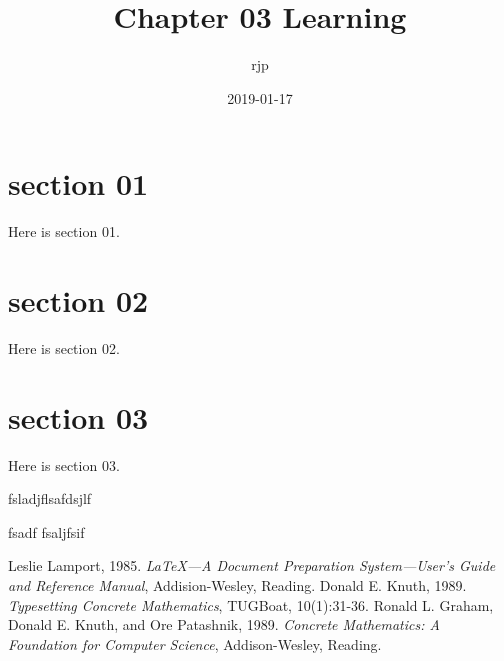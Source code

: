 \documentclass[a4paper, UTF8]{article}
\begin{document}
\pagestyle{headings}

\title{Chapter 03 Learning}
\author{rjp}
\date{2019-01-17}
\maketitle

\section{section 01}
Here is section 01.

\section{section 02}
Here is section 02.

\section{section 03}

Here is section 03.

fsladjflsafdsjlf

fsadf \citet*{les(85)} fsaljfsif


\begin{thebibliography}{9}
    Leslie Lamport, 1985. \emph{\LaTeX---A Document Preparation System---User’s Guide and Reference Manual}, Addision-Wesley, Reading.
    Donald E. Knuth, 1989. \emph{Typesetting Concrete Mathematics}, TUGBoat, 10(1):31-36.
    Ronald L. Graham, Donald E. Knuth, and Ore Patashnik, 1989. \emph{Concrete Mathematics: A Foundation for Computer Science}, Addison-Wesley, Reading.
\end{thebibliography}
\end{document}

